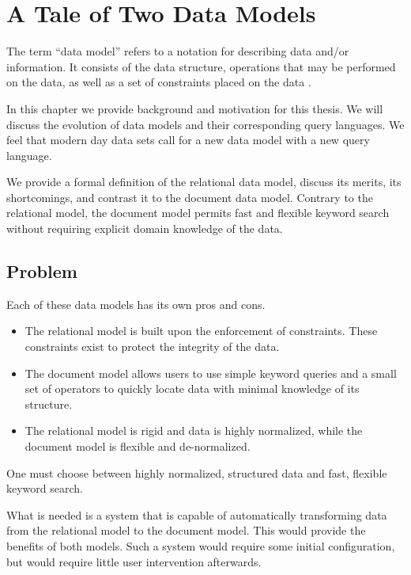 \chapter{A Tale of Two Data Models}
\label{chap:tale-of-two-data-models}
	The term ``data model'' refers to a notation for describing data and/or information.  It consists of the data structure, operations that may be performed on the data, as well as a set of constraints placed on the data \cite{dbsys-06}.
	
	In this chapter we provide background and motivation for this thesis.  We will discuss the evolution of data models and their corresponding query languages.  We feel that modern day data sets call for a new data model with a new query language.
	
	We provide a formal definition of the relational data model, discuss its merits, its shortcomings, and contrast it to the document data model.  Contrary to the relational model, the document model permits fast and flexible keyword search without requiring explicit domain knowledge of the data.
	
	
	
	
	
	\section{Problem}
		Each of these data models has its own pros and cons.
		
		\begin{itemize}
			\item The relational model is built upon the enforcement of constraints.  These constraints exist to protect the integrity of the data.
			\item The document model allows users to use simple keyword queries and a small set of operators to quickly locate data with minimal knowledge of its structure.
			\item The relational model is rigid and data is highly normalized, while the document model is flexible and de-normalized.
		\end{itemize}
		
		One must choose between highly normalized, structured data and fast, flexible keyword search.
		
		What is needed is a system that is capable of automatically transforming data from the relational model to the document model.  This would provide the benefits of both models.  Such a system would require some initial configuration, but would require little user intervention afterwards.
	
